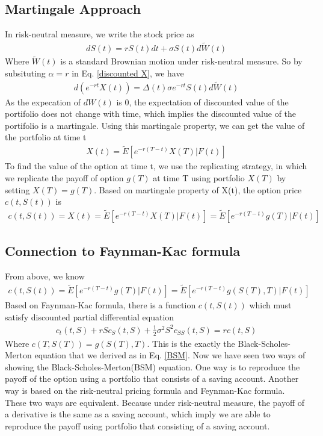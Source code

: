 \documentclass[a4paper]{article}
\begin{document}
\subsection{Martingale Approach}
In risk-neutral measure, we write the stock price as
\begin{align*}
	dS(t) = rS(t) dt + \sigma S(t) d \tilde W(t) 
\end{align*}
Where $\tilde W(t)$ is a standard Brownian motion under risk-neutral measure. So by subsituting $\alpha = r$ in Eq. \ref{discounted X}, we have
\begin{align*}
 d(e^{- r t} X(t)) 
 =  \Delta(t) \sigma e^{-rt} S(t) d \tilde W(t)
\end{align*}
As the expecation of $dW(t)$ is 0, the expectation of discounted value of the portifolio does not change with time, which implies the discounted value of the portifolio is a martingale. Using this martingale property, we can get the value of the portfolio at time t 
\begin{align*}
	X(t) = \tilde E[e^{-r(T-t)}X(T)| F(t)]
\end{align*}
To find the value of the option at time t, we use the replicating strategy, in which we replicate the payoff of option $g(T)$ at time T using portfolio $X(T)$ by setting $X(T) = g(T)$.
Based on martingale property of X(t), the option price $c(t, S(t))$ is
\begin{align*}
	c(t, S(t)) = X(t) = \tilde E[e^{-r(T-t)}X(T)| F(t)]= \tilde E[e^{-r(T-t)}g(T)| F(t)]
\end{align*}
\subsection{Connection to Faynman-Kac formula}
From above, we know
\begin{align}
	c(t, S(t)) = \tilde E[e^{-r(T-t)}g(T)| F(t)] = \tilde E[e^{-r(T-t)}g(S(T),T)| F(t)] \label{rn}
\end{align}
Based on Faynman-Kac formula, there is a function $c(t,S(t))$ which must satisfy discounted partial differential equation 
\begin{align*}
	c_t(t,S) + rS c_S(t,S) + \frac{1}{2} \sigma^2 S^2 c_{SS}(t,S) = rc(t,S)
\end{align*}
Where $c(T,S(T)) = g(S(T), T)$. This is the exactly the Black-Scholes-Merton equation that we derived as in Eq. \ref{BSM}. Now we have seen two ways of showing the Black-Scholes-Merton(BSM) equation. 
One way is to reproduce the payoff of the option using a portfolio that consists of a 
saving account. Another way is based on the risk-neutral pricing formula and Feynman-Kac formula. 
These two ways are equivalent. Because under risk-neutral measure, the payoff of a derivative is the same as a saving account, which imply we are able to reproduce the payoff using portfolio that consisting of a saving account.
\end{document}
